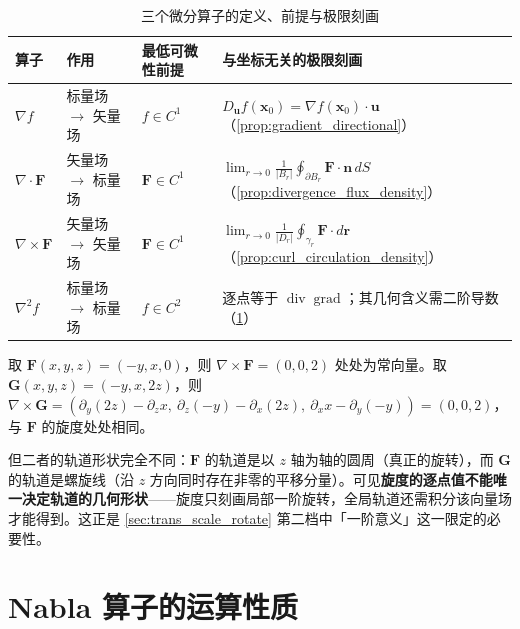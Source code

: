 \begin{table}[htbp]
    \centering
    \caption{三个微分算子的定义、前提与极限刻画}
    \label{tab:operators_summary}
    \renewcommand{\arraystretch}{1.3}
    \begin{tabularx}{\textwidth}{@{}l l l X@{}}
        \toprule
        \textbf{算子} & \textbf{作用} & \textbf{最低可微性前提} & \textbf{与坐标无关的极限刻画} \\
        \midrule
        $\nabla f$ & 标量场 $\to$ 矢量场 & $f\in C^1$ & $D_{\mathbf u}f(\mathbf x_0)=\nabla f(\mathbf x_0)\cdot\mathbf u$（\cref{prop:gradient_directional}）\\
        $\nabla\cdot\mathbf F$ & 矢量场 $\to$ 标量场 & $\mathbf F\in C^1$ & $\displaystyle\lim_{r\to0}\frac{1}{|B_r|}\oint_{\partial B_r}\mathbf F\cdot\mathbf n\,dS$（\cref{prop:divergence_flux_density}）\\
        $\nabla\times\mathbf F$ & 矢量场 $\to$ 矢量场 & $\mathbf F\in C^1$ & $\displaystyle\lim_{r\to0}\frac{1}{|D_r|}\oint_{\gamma_r}\mathbf F\cdot d\mathbf r$（\cref{prop:curl_circulation_density}）\\
        $\nabla^2 f$ & 标量场 $\to$ 标量场 & $f\in C^2$ & 逐点等于 $\operatorname{div}\operatorname{grad}$；其几何含义需二阶导数（\cref{sec:nabla_properties}）\\
        \bottomrule
    \end{tabularx}
\end{table}

\begin{example}\label{ex:constant_curl_nonrotation}
取 $\mathbf F(x,y,z) = (-y, x, 0)$，则 $\nabla\times\mathbf F = (0,0,2)$ 处处为常向量。取 $\mathbf G(x,y,z) = (-y, x, 2z)$，则 $\nabla\times\mathbf G = (\partial_y(2z)-\partial_z x,\ \partial_z(-y)-\partial_x(2z),\ \partial_x x-\partial_y(-y)) = (0,0,2)$，与 $\mathbf F$ 的旋度处处相同。

但二者的轨道形状完全不同：$\mathbf F$ 的轨道是以 $z$ 轴为轴的圆周（真正的旋转），而 $\mathbf G$ 的轨道是螺旋线（沿 $z$ 方向同时存在非零的平移分量）。可见\textbf{旋度的逐点值不能唯一决定轨道的几何形状}——旋度只刻画局部一阶旋转，全局轨道还需积分该向量场才能得到。这正是 \cref{sec:trans_scale_rotate} 第二档中「一阶意义」这一限定的必要性。
\end{example}

\section{Nabla 算子的运算性质}\label{sec:nabla_properties}

